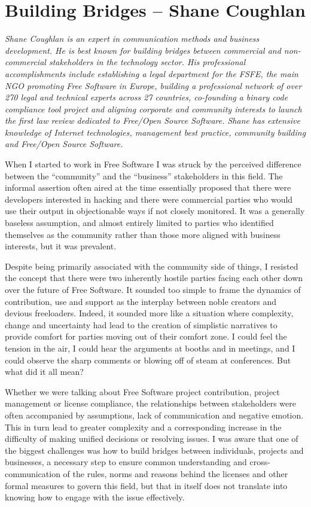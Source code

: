 \chapter{Building Bridges -- Shane Coughlan}

\textit{Shane Coughlan is an expert in communication methods and business
development. He is best known for building bridges between commercial and
non-commercial stakeholders in the technology sector. His professional
accomplishments include establishing a legal department for the FSFE, the main NGO
promoting Free Software in Europe, building a professional network of over 270
legal and technical experts across 27 countries, co-founding a binary code
compliance tool project and aligning corporate and community interests to launch
the first law review dedicated to Free/Open Source Software. Shane has extensive
knowledge of Internet technologies, management best practice, community building
and Free/Open Source Software.}

When I started to work in Free Software I was struck by the perceived difference
between the ``community'' and the ``business'' stakeholders in this field. The
informal assertion often aired at the time essentially proposed that there were
developers interested in hacking and there were commercial parties who would use
their output in objectionable ways if not closely monitored. It was a generally
baseless assumption, and almost entirely limited to parties who identified
themselves as the community rather than those more aligned with business
interests, but it was prevalent.

Despite being primarily associated with the community side of things, I resisted
the concept that there were two inherently hostile parties facing each other
down over the future of Free Software. It sounded too simple to frame the
dynamics of contribution, use and support as the interplay between noble
creators and devious freeloaders. Indeed, it sounded more like a situation where
complexity, change and uncertainty had lead to the creation of simplistic
narratives to provide comfort for parties moving out of their comfort zone. I
could feel the tension in the air, I could hear the arguments at booths and in
meetings, and I could observe the sharp comments or blowing off of steam at
conferences. But what did it all mean?

Whether we were talking about Free Software project contribution, project
management or license compliance, the relationships between stakeholders were
often accompanied by assumptions, lack of communication and negative emotion.
This in turn lead to greater complexity and a corresponding increase in the
difficulty of making unified decisions or resolving issues. I was aware that one
of the biggest challenges was how to build bridges between individuals, projects
and businesses, a necessary step to ensure common understanding and
cross-communication of the rules, norms and reasons behind the licenses and
other formal measures to govern this field, but that in itself does not
translate into knowing how to engage with the issue effectively.

